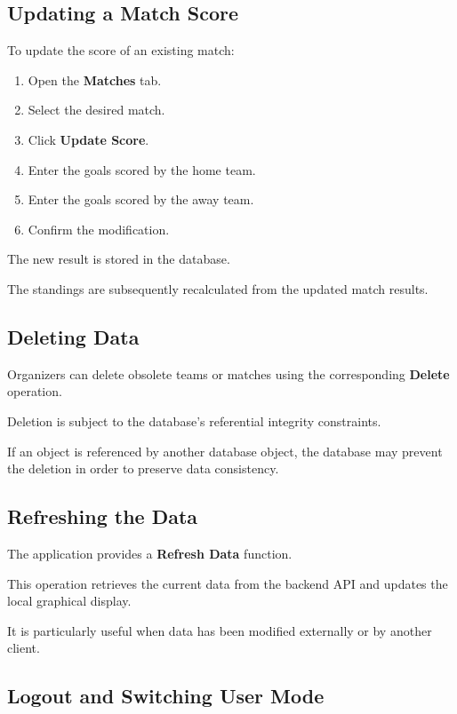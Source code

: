 \documentclass[12pt,a4paper]{article}
\begin{document}
\subsection{Updating a Match Score}

To update the score of an existing match:

\begin{enumerate}
\item Open the \textbf{Matches} tab.
\item Select the desired match.
\item Click \textbf{Update Score}.
\item Enter the goals scored by the home team.
\item Enter the goals scored by the away team.
\item Confirm the modification.
\end{enumerate}

The new result is stored in the database.

The standings are subsequently recalculated from the updated
match results.

\subsection{Deleting Data}

Organizers can delete obsolete teams or matches using the
corresponding \textbf{Delete} operation.

Deletion is subject to the database's referential integrity
constraints.

If an object is referenced by another database object, the
database may prevent the deletion in order to preserve data
consistency.

\subsection{Refreshing the Data}

The application provides a \textbf{Refresh Data} function.

This operation retrieves the current data from the backend API
and updates the local graphical display.

It is particularly useful when data has been modified externally
or by another client.

\subsection{Logout and Switching User Mode}
\end{document}

